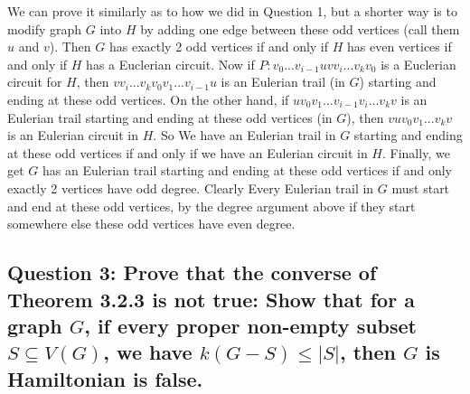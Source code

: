 \documentclass[letterpaper, 11pt]{article}
\newcommand{\1}{\mathds{1}}	%
\theoremstyle{definition}
\begin{document}
We can prove it similarly as to how we did in Question 1, but a shorter way is to modify graph $G$ into $H$ by adding one edge between these odd vertices (call them $u$ and $v$). Then $G$ has exactly 2 odd vertices if and only if $H$ has even vertices if and only if $H$ has a Euclerian circuit. Now if $P: v_0...v_{i-1}uvv_i...v_kv_0$ is a Euclerian circuit for $H$, then $vv_i...v_kv_0v_1...v_{i-1}u$ is an Eulerian trail (in $G$) starting and ending at these odd vertices. On the other hand, if $uv_0v_1...v_{i-1}v_i...v_kv$ is an Eulerian trail starting and ending at these odd vertices (in $G$), then $vuv_0v_1...v_kv$ is an Eulerian circuit in $H$. So We have an Eulerian trail in $G$ starting and ending at these odd vertices if and only if we have an Eulerian circuit in $H$. Finally, we get $G$ has an Eulerian trail starting and ending at these odd vertices if and only exactly 2 vertices have odd degree. Clearly Every Eulerian trail in $G$ must start and end at these odd vertices, by the degree argument above if they start somewhere else these odd vertices have even degree.

\newpage

\subsection*{Question 3: Prove that the converse of Theorem 3.2.3 is not true: Show that for a graph $G$, if every proper non-empty subset $S \subseteq V(G)$, we have $k(G-S) \le |S|$, then $G$ is Hamiltonian is false. }
\end{document}
